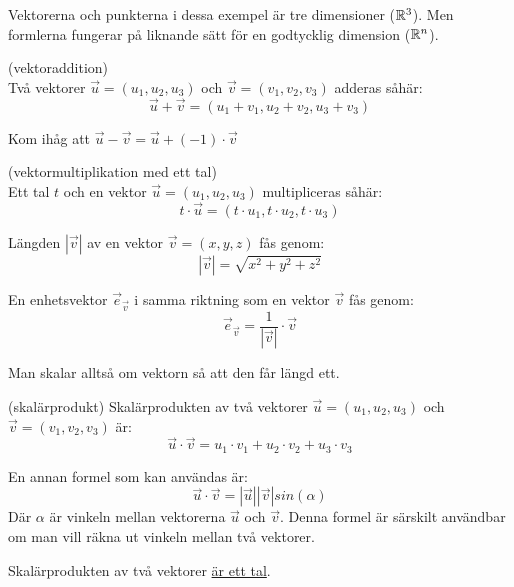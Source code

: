 \documentclass[../main.tex]{subfiles}
\begin{document}
Vektorerna och punkterna i dessa exempel är tre dimensioner ($\mathbb{R}^{3}$). Men formlerna fungerar på liknande sätt för en godtycklig dimension ($\mathbb{R}^{n}$).

\begin{formel}{(vektoraddition)}\\
\label{vecadd}
Två vektorer $\vec{u} = (u_1, u_2, u_3)$ och $\vec{v} = (v_1, v_2, v_3)$ adderas såhär:
\[
\vec{u} + \vec{v} = (u_1 + v_1, u_2 + v_2, u_3 + v_3)
\]

Kom ihåg att $\vec{u} - \vec{v} = \vec{u} + (-1)\cdot\vec{v}$
\end{formel}


\begin{formel}{(vektormultiplikation med ett tal)}\\
\label{vecscale}
Ett tal $t$ och en vektor $\vec{u} = (u_1, u_2, u_3)$ multipliceras såhär:
\[
t \cdot \vec{u} = (t \cdot u_1, t \cdot u_2, t \cdot u_3)
\]
\end{formel}



\begin{formel}
\label{veclength}
Längden $|\vec{v}|$ av en vektor $\vec{v} = (x, y, z)$ fås genom:
\[
|\vec{v}| = \sqrt{x^2+y^2+z^2}
\]

\end{formel}


\begin{formel}
\label{unitvec}
En enhetsvektor $\vec{e}_\vec{v}$ i samma riktning som en vektor $\vec{v}$ fås genom:
\[
    \vec{e}_{\vec{v}} = \frac{1}{|\vec{v}|} \cdot \vec{v} 
\]

Man skalar alltså om vektorn så att den får längd ett.
\end{formel}


\begin{formel}{(skalärprodukt)}
\label{skalarprod}
Skalärprodukten av två vektorer $\vec{u} = (u_1, u_2, u_3)$ och $\vec{v} = (v_1, v_2, v_3)$ är:
\[
\vec{u} \cdot \vec{v} = u_1 \cdot v_1 + u_2 \cdot v_2 + u_3 \cdot v_3
\]

En annan formel som kan användas är: 
\[
\vec{u} \cdot \vec{v} = |\vec{u}||\vec{v}|sin(\alpha)
\]
Där $\alpha$ är vinkeln mellan vektorerna $\vec{u}$ och $\vec{v}$. Denna formel är särskilt användbar om man vill räkna ut vinkeln mellan två vektorer.

Skalärprodukten av två vektorer \underline{är ett tal}.
\end{formel}
\end{document}
